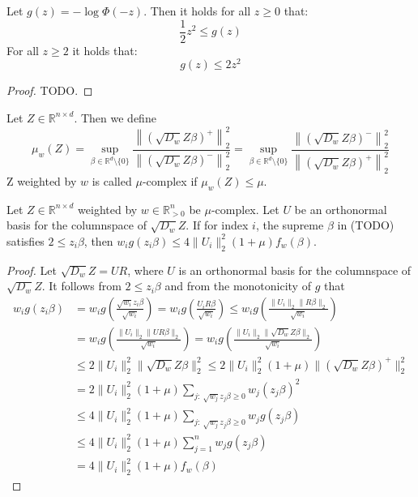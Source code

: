 \begin{lemma}
    Let $g(z) = -\log \Phi(-z)$. Then it holds for all $z \geq 0$ that:
    $$
        \frac{1}{2} z^2 \leq g(z)
    $$
    For all $z \geq 2$ it holds that:
    $$
        g(z) \leq 2z^2
    $$
\end{lemma}
\begin{proof}
    TODO.
\end{proof}

\begin{definition}
    Let $Z \in \mathbb{R}^{n \times d}$. Then we define
    $$
        \mu_w(Z) = \sup_{\beta \in \mathbb{R}^d \setminus \{0\}}
        \frac{\left \lVert (\sqrt{D_w} Z \beta)^+ \right \rVert_2^2}
        {\left \lVert (\sqrt{D_w} Z \beta)^- \right \rVert_2^2}
        =
        \sup_{\beta \in \mathbb{R}^d \setminus \{0\}}
        \frac{\left \lVert (\sqrt{D_w} Z \beta)^- \right \rVert_2^2}
        {\left \lVert (\sqrt{D_w} Z \beta)^+ \right \rVert_2^2}
    $$
    Z weighted by $w$ is called $\mu$-complex if $\mu_w(Z) \leq \mu$.
\end{definition}

\begin{lemma}
    Let $Z \in \mathbb{R}^{n \times d}$ weighted by $w \in \mathbb{R}^n_{>0}$
    be $\mu$-complex. Let $U$ be an orthonormal basis for the columnspace
    of $\sqrt{D_w} Z$. If for index $i$, the supreme $\beta$ in (TODO) satisfies
    $2 \leq z_i \beta$, then
    $w_i g(z_i \beta) \leq 4 \lVert U_i \rVert_2^2 (1 + \mu) f_w(\beta)$.
\end{lemma}
\begin{proof}
    Let $\sqrt{D_w} Z = UR$, where $U$ is an orthonormal basis for the columnspace
    of $\sqrt{D_w} Z$. It follows from $2 \leq z_i \beta$ and from the monotonicity
    of $g$ that
    \begin{align*}
        w_i g(z_i \beta)
         & = w_i g\left(\frac{\sqrt{w_i} z_i \beta}{\sqrt{w_i}}\right)
        = w_i g\left(\frac{U_i R \beta}{\sqrt{w_i}}\right)
        \leq w_i g\left(\frac{\lVert U_i \rVert_2 \lVert R \beta \rVert_2}{\sqrt{w_i}}\right)               \\
         & = w_i g\left(\frac{\lVert U_i \rVert_2 \lVert U R \beta \rVert_2}{\sqrt{w_i}}\right)
        = w_i g\left(\frac{\lVert U_i \rVert_2 \lVert \sqrt{D_w} Z \beta \rVert_2}{\sqrt{w_i}}\right)       \\
         & \leq 2 \lVert U_i \rVert_2^2 \lVert \sqrt{D_w} Z \beta \rVert_2^2
        \leq 2 \lVert U_i \rVert_2^2 (1 + \mu) \lVert (\sqrt{D_w} Z \beta)^+ \rVert_2^2                     \\
         & = 2 \lVert U_i \rVert_2^2 (1 + \mu) \sum_{j: \  \sqrt{w_j} z_j \beta \geq 0} w_j (z_j \beta)^2   \\
         & \leq 4 \lVert U_i \rVert_2^2 (1 + \mu) \sum_{j: \  \sqrt{w_j} z_j \beta \geq 0} w_j g(z_j \beta) \\
         & \leq 4 \lVert U_i \rVert_2^2 (1 + \mu) \sum_{j = 1}^n w_j g(z_j \beta)                           \\
         & = 4 \lVert U_i \rVert_2^2 (1 + \mu) f_w(\beta)
    \end{align*}
\end{proof}

